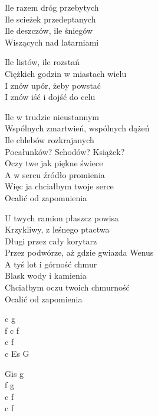 \begin{text}
    Ile razem dróg przebytych\\
    Ile scieżek przedeptanych\\
    Ile deszczów, ile śniegów\\
    Wiszących nad latarniami

    Ile listów, ile rozstań\\
    Ciężkich godzin w miastach wielu\\
    I znów upór, żeby powstać\\
    I znów iść i dojść do celu

    Ile w trudzie nieustannym\\
    Wspólnych zmartwień, wspólnych dążeń\\
    Ile chlebów rozkrajanych\\
    Pocałunków? Schodów? Książek?\\
    Oczy twe jak piękne świece\\
    A w sercu źródło promienia\\
    Więc ja chciałbym twoje serce\\
    Ocalić od zapomnienia

    U twych ramion płaszcz powisa\\
    Krzykliwy, z leśnego ptactwa\\
    Długi przez cały korytarz\\
    Przez podwórze, aż gdzie gwiazda Wenus\\
    A tyś lot i górność chmur\\
    Blask wody i kamienia\\
    Chciałbym oczu twoich chmurność\\
    Ocalić od zapomienia
\end{text}
\begin{chord}
    c g\\
    f c f\\
    c f\\
    c Es G

    Gis g\\
    f g\\
    c f\\
    c f
\end{chord}